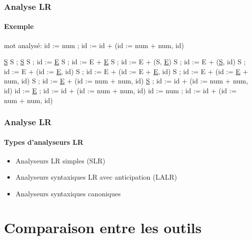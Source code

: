 \documentclass{beamer}
\begin{document}
\begin{frame}\frametitle{Analyse LR}\framesubtitle{Exemple}

mot analysé:   id := num ; id := id + (id := num + num, id)

\newline\newline
\underline{S}\newline
S ; \underline{S}\newline
S ; id := \underline{E}\newline
S ; id := E + \underline{E}\newline
S ; id := E + (S, \underline{E})\newline
S ; id := E + (\underline{S}, id)\newline
S ; id := E + (id := \underline{E}, id)\newline
S ; id := E + (id := E + \underline{E}, id)\newline
S ; id := E + (id := \underline{E} + num, id)\newline
S ; id := \underline{E} + (id := num + num, id)\newline
\underline{S} ; id := id + (id := num + num, id)\newline
id := \underline{E} ; id := id + (id := num + num, id)\newline
id := num ; id := id + (id := num + num, id)\newline

\end{frame}

\begin{frame}\frametitle{Analyse LR}\framesubtitle{Types d'analyseurs LR}

\begin{itemize}
			\item Analyseurs LR simples (SLR)\newline
			\item Analyseurs syntaxiques LR avec anticipation (LALR)\newline
			\item Analyseurs syntaxiques canoniques\newline
\end{itemize}

\end{frame}





\section{Comparaison entre les outils}
\end{document}
